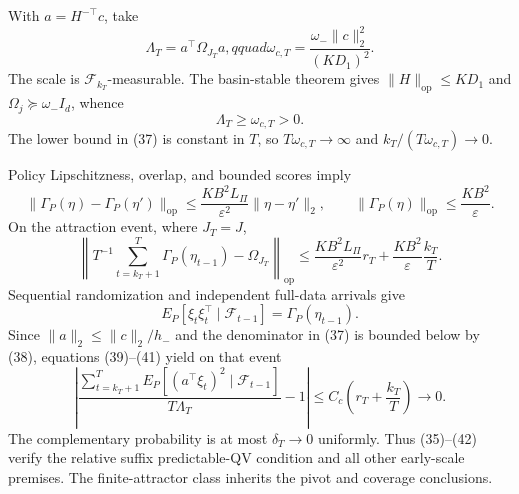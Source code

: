 With \(a=H^{-\top}c\), take
\[
 \Lambda_T=a^\top\Omega_{J_T}a,qquad
 \omega_{c,T}=\frac{\omega_-\|c\|_2^2}{(KD_1)^2}.
\tag{37}
\]
The scale is \(\mathcal F_{k_T}\)-measurable.  The basin-stable theorem gives \(\|H\|_{\mathrm{op}}\le KD_1\) and \(\Omega_j\succeq\omega_-I_d\), whence
\[
 \Lambda_T\ge\omega_{c,T}>0.
\tag{38}
\]
The lower bound in (37) is constant in \(T\), so \(T\omega_{c,T}\to\infty\) and \(k_T/(T\omega_{c,T})\to0\).

Policy Lipschitzness, overlap, and bounded scores imply
\[
 \|\Gamma_P(\eta)-\Gamma_P(\eta')\|_{\mathrm{op}}
 \le\frac{KB^2L_\Pi}{\varepsilon^2}\|\eta-\eta'\|_2,
 \qquad \|\Gamma_P(\eta)\|_{\mathrm{op}}\le\frac{KB^2}{\varepsilon}.
\tag{39}
\]
On the attraction event, where \(J_T=J\),
\[
 \left\|T^{-1}\sum_{t=k_T+1}^T\Gamma_P(\eta_{t-1})-
 \Omega_{J_T}\right\|_{\mathrm{op}}
 \le\frac{KB^2L_\Pi}{\varepsilon^2}r_T
 +\frac{KB^2}{\varepsilon}\frac{k_T}{T}.
\tag{40}
\]
Sequential randomization and independent full-data arrivals give
\[
 E_P[\xi_t\xi_t^\top\mid\mathcal F_{t-1}]
 =\Gamma_P(\eta_{t-1}).
\tag{41}
\]
Since \(\|a\|_2\le\|c\|_2/h_-\) and the denominator in (37) is bounded below by (38), equations (39)--(41) yield on that event
\[
 \left|
 \frac{\sum_{t=k_T+1}^TE_P[(a^\top\xi_t)^2\mid\mathcal F_{t-1}]}
 {T\Lambda_T}-1\right|
 \le C_c\left(r_T+\frac{k_T}{T}\right)\longrightarrow0.
\tag{42}
\]
The complementary probability is at most \(\delta_T\to0\) uniformly.  Thus (35)--(42) verify the relative suffix predictable-QV condition and all other early-scale premises.  The finite-attractor class inherits the pivot and coverage conclusions.
